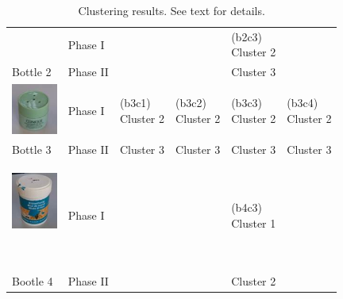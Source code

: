 \begin{table}
\begin{tabular}{p{1.4cm} p{1.4cm}|p{1.6cm} p{1.6cm} p{1.6cm}  p{1.6cm} }
         & Phase I  &           &           &{\vspace{-0.7cm}}\pbox{2cm}{(b2c3) \\Cluster 2} &           \\
Bottle 2 & Phase II &           &           &       Cluster 3 &           \\ \hline
{\parbox[c]{1em}{\includegraphics[width=1.5cm]{./fig/b3.jpg}} }
         & Phase I  &{\vspace{-0.7cm}}\pbox{2cm}{(b3c1) \\Cluster 2} &{\vspace{-0.7cm}}\pbox{2cm}{(b3c2) \\Cluster 2} &{\vspace{-0.7cm}}\pbox{2cm}{(b3c3) \\Cluster 2} &{\vspace{-0.7cm}}\pbox{2cm}{(b3c4) \\Cluster 2} \\
Bottle 3 & Phase II &       Cluster 3 &       Cluster 3 &       Cluster 3 &       Cluster 3 \\ \hline
{\parbox[c]{1em}{\includegraphics[width=1.5cm]{./fig/b4.jpg}}\newline }
         & Phase I  &           &           &{\vspace{-0.7cm}}\pbox{2cm}{(b4c3) \\Cluster 1} &           \\
Bootle 4 & Phase II &           &           &       Cluster 2 &           \\ \hline
\end{tabular}
\caption{Clustering results.  See text for details.}
\label{tab:cluster}
\end{table}

